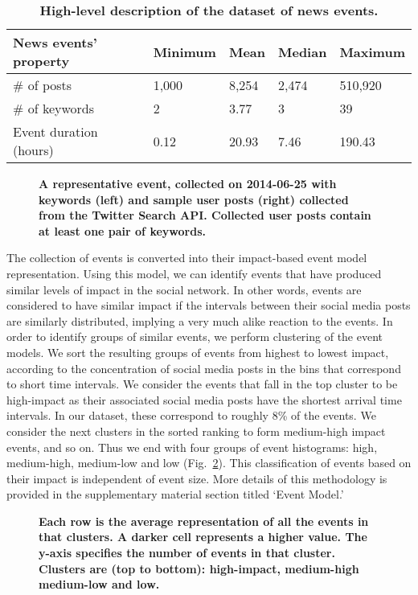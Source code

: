 \begin{table}
  \centering
  \begin{tabularx}{\textwidth}{@{}p{6cm}llll@{}}
    \toprule
    \textbf{News events' property} & \textbf{Minimum} & \textbf{Mean} & \textbf{Median} & \textbf{Maximum} \\ \midrule
    \# of posts & 1,000 & 8,254 & 2,474 & 510,920 \\
    \# of keywords & 2 & 3.77 & 3 & 39 \\
    Event duration (hours) & 0.12 & 20.93 & 7.46 & 190.43 \\ \bottomrule
  \end{tabularx}
  \caption{\bf High-level description of the dataset of news events.} \label{table:dataset-stats}
\end{table}

\begin{figure}
  \caption{\textbf{A representative event, collected on 2014-06-25
      with keywords (left) and sample user posts (right) collected
      from the Twitter Search API. Collected user posts contain at
      least one pair of keywords. }}
  \label{fig:components}
\end{figure}


The collection of events is converted into their impact-based event
model representation. Using this model, we can identify events that
have produced similar levels of impact in the social network. In other
words, events are considered to have similar impact if the intervals
between their social media posts are similarly distributed, implying a
very much alike reaction to the events. In order to identify groups of
similar events, we perform clustering of the event models. We sort the
resulting groups of events from highest to lowest impact, according to
the concentration of social media posts in the bins that correspond to
short time intervals. We consider the events that fall in the top
cluster to be high-impact as their associated social media posts have
the shortest arrival time intervals.  In our dataset, these correspond
to roughly 8\% of the events.  We consider the next clusters in the
sorted ranking to form medium-high impact events, and so on.  Thus we
end with four groups of event histograms: high, medium-high,
medium-low and low (Fig.~\ref{fig:low_buzz_high_buzz}). This
classification of events based on their impact is independent of event
size. More details of this methodology is provided in the
supplementary material section titled `Event Model.'

\begin{figure}
  \caption{\textbf{Each row is the average representation of all the
      events in that clusters.  A darker cell represents a higher
      value.  The y-axis specifies the number of events in that
      cluster.  Clusters are (top to bottom): high-impact, medium-high
      medium-low and low.}
  }
  \label{fig:low_buzz_high_buzz}
\end{figure}
